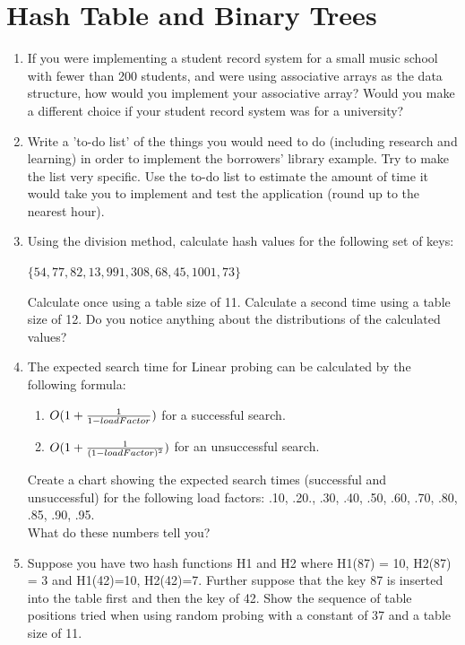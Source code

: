 \documentclass{article}
\begin{document}
\medskip
\section{Hash Table and Binary Trees}

\begin{enumerate}
	\item If you were implementing a student record system for a small music school with fewer than 200 students, and were using associative arrays as the data structure, how would you implement your associative array? Would you make a different choice if your student record system was for a university?
	\vspace{2cm}
	\item Write a ’to-do list’ of the things you would need to do (including research and learning) in order to implement the borrowers’ library example. Try to make the list very specific. Use the to-do list to estimate the amount of time it would take you to implement and test the application (round up to the nearest hour).
	\vspace{5cm}
	\item Using the division method, calculate hash values for the following set of keys:
		\begin{center}	
			\(\{54, 77, 82, 13, 991, 308, 68, 45, 1001, 73\}\)
		\end{center}
		Calculate once using a table size of 11. Calculate a second time using a table size of 12. Do you notice anything about the distributions of the calculated values?
		\vspace{2cm}
	\newpage
	\item The expected search time for Linear probing can be calculated by the following formula:
		\begin{enumerate}[label=\roman*.]
			\item \(O(1 + {1 \over 1 - loadFactor})\) for a successful search.
			\item \(O(1 + {1 \over {(1 - loadFactor})^2})\) for an unsuccessful search.
		\end{enumerate}
		Create a chart showing the expected search times (successful and unsuccessful) for the following load factors: .10, .20., .30, .40, .50, .60, .70, .80, .85, .90, .95. \\
		What do these numbers tell you?
	\vspace{2cm}
	\item Suppose you have two hash functions H1 and H2 where H1(87) = 10, H2(87) = 3 and H1(42)=10, H2(42)=7. Further suppose that the key 87 is inserted into the table first and then the key of 42. Show the sequence of table positions tried when using random probing with a constant of 37 and a table size of 11.

\end{enumerate}
\end{document}
